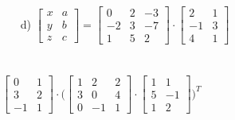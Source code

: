 \documentclass{article}
\begin{document}
\begin{itemize}
\item [d)] $\begin{bmatrix} 
			x & a \\ y & b \\ z & c
			\end{bmatrix}
			=
			\begin{bmatrix} 
			0  & 2 &-3 \\ 
			-2 & 3 &-7 \\ 
			1  & 5 & 2
			\end{bmatrix}
			\cdot
			\begin{bmatrix} 
			2 & 1\\ -1 & 3 \\ 4 & 1
			\end{bmatrix}$
\end{itemize}

\section{}
$ 
\begin{bmatrix}
0 & 1 \\
3 & 2 \\
-1 & 1
\end{bmatrix}
\cdot
\bigg(
\begin{bmatrix}
1 & 2 & 2\\
3 & 0 & 4\\
0 & -1 & 1
\end{bmatrix}
\cdot
\begin{bmatrix}
1 & 1 \\
5 & -1 \\
1 & 2
\end{bmatrix}
\bigg)^T
$
\end{document}
